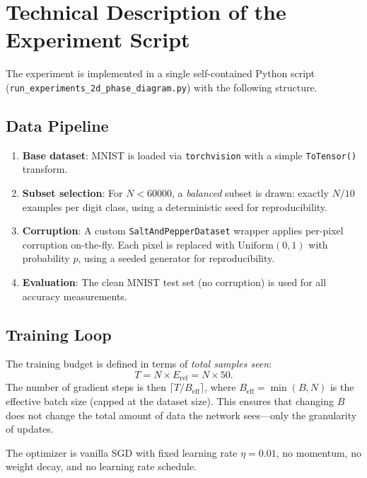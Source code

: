 \documentclass[11pt,a4paper]{article}
\begin{document}
\section{Technical Description of the Experiment Script}

The experiment is implemented in a single self-contained Python script (\texttt{run\_experiments\_2d\_phase\_diagram.py}) with the following structure.

\subsection{Data Pipeline}

\begin{enumerate}
  \item \textbf{Base dataset}: MNIST is loaded via \texttt{torchvision} with a simple \texttt{ToTensor()} transform.
  \item \textbf{Subset selection}: For $N < 60000$, a \emph{balanced} subset is drawn: exactly $N/10$ examples per digit class, using a deterministic seed for reproducibility.
  \item \textbf{Corruption}: A custom \texttt{SaltAndPepperDataset} wrapper applies per-pixel corruption on-the-fly. Each pixel is replaced with $\mathrm{Uniform}(0,1)$ with probability $p$, using a seeded generator for reproducibility.
  \item \textbf{Evaluation}: The clean MNIST test set (no corruption) is used for all accuracy measurements.
\end{enumerate}

\subsection{Training Loop}

The training budget is defined in terms of \emph{total samples seen}:
\[
  T = N \times E_{\mathrm{ref}} = N \times 50.
\]
The number of gradient steps is then $\lceil T / B_{\mathrm{eff}} \rceil$, where $B_{\mathrm{eff}} = \min(B, N)$ is the effective batch size (capped at the dataset size).
This ensures that changing $B$ does not change the total amount of data the network sees---only the granularity of updates.

The optimizer is vanilla SGD with fixed learning rate $\eta = 0.01$, no momentum, no weight decay, and no learning rate schedule.
\end{document}
